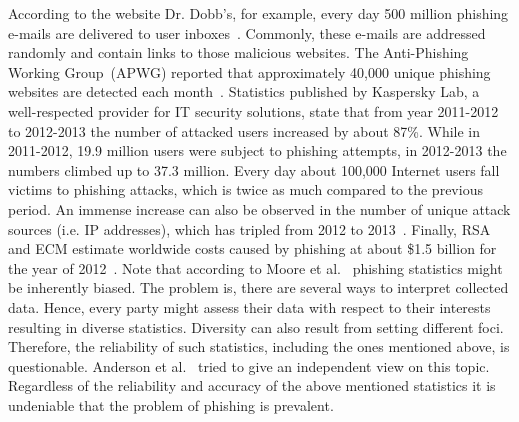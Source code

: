 According to the website Dr. Dobb's, for example, every day 500 million phishing e-mails are delivered to user inboxes~\cite{drdobb2012email}.
Commonly, these e-mails are addressed randomly and contain links to those malicious websites.
The Anti-Phishing Working Group~(APWG) reported that approximately 40,000 unique phishing websites are detected each month~\cite{antiphishingtrendreport2013}. Statistics published by Kaspersky Lab, a well-respected provider for IT security solutions, state that from year 2011-2012 to 2012-2013 the number of attacked users increased by about 87\%. 
While in 2011-2012, 19.9 million users were subject to phishing attempts, in 2012-2013 the numbers climbed up to 37.3 million. 
 Every day about 100,000 Internet users fall victims to phishing attacks, which is twice as much compared to the previous period. An immense increase can also be observed in the number of unique attack sources (i.e. IP addresses), which has tripled from 2012 to 2013~\cite{kasperskyreport2013}. 
Finally, RSA and ECM estimate worldwide costs caused by phishing at about \$1.5 billion for the year of 2012~\cite{rsa2013}. Note that according to Moore et al.~\cite{moore2010hard} phishing statistics might be inherently biased. 
The problem is, there are several ways to interpret collected data. 
Hence, every party might assess their data with respect to their interests resulting in diverse statistics. 
Diversity can also result from setting different foci.
Therefore, the reliability of such statistics, including the ones mentioned above, is questionable. 
Anderson et al.~\cite{anderson2012measuring} tried to give an independent view on this topic.
Regardless of the reliability and accuracy of the above mentioned statistics it is undeniable that the problem of phishing is prevalent.

